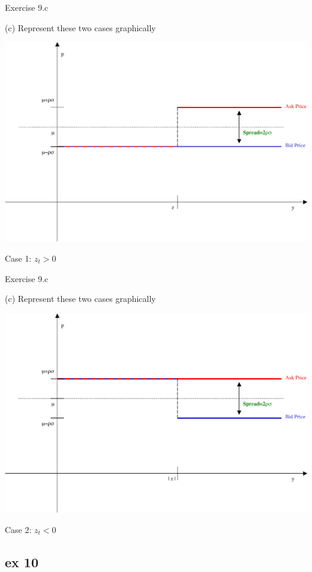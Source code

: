 \documentclass[english,10pt
,aspectratio=169
]{beamer}
\begin{document}
\begin{frame}{Exercise 9.c}
	\begin{exampleblock}{}
		(c) Represent these two cases graphically
	\end{exampleblock}
	\centering
	\includegraphics[scale=0.2]{pics/ex9c_1}
	
	Case 1: $z_t > 0$
\end{frame}


\begin{frame}{Exercise 9.c}
	\begin{exampleblock}{}
		(c) Represent these two cases graphically
	\end{exampleblock}
	\centering
	\includegraphics[scale=0.2]{pics/ex9c_2}
	
	Case 2: $z_t < 0$
\end{frame}




\subsection{ex 10}
\end{document}
